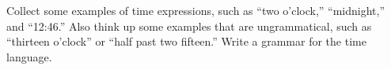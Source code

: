






\begin{uexercise}
Collect some examples of time expressions,
such as ``two o'clock,'' ``midnight,'' and ``12:46.''  Also think up
some examples that are ungrammatical, such as ``thirteen o'clock'' or
``half past two fifteen.''  Write a grammar for the time language.
\end{uexercise} 



